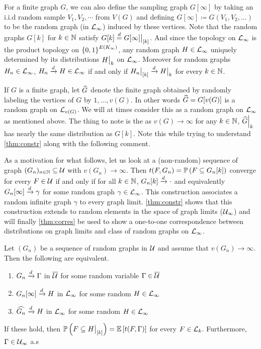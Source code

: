 \documentclass{article}
\begin{document}
For a finite graph $G$, we can also define the sampling graph $G[\infty]$ by taking an i.i.d random sample $V_1, V_2,\cdots$ from $V(G)$ and defining $G[\infty] \coloneqq G(V_1, V_2, \ldots)$ to be the random graph (in $\Lg_{\infty}$) induced by these vertices. Note that the random graphs $G[k]$ for $k \in \N$ satisfy $G[k] \dequal \restr{G[\infty]}{[k]}$. And since the topology on $\Lg_{\infty}$ is the product topology on $\left\{ 0,1 \right\}^{E(K_\infty)}$, any random graph $H \in \Lg_{\infty}$ uniquely determined by its distributions $\restr{H}{k}$ on $\Lg_{\infty}$. Moreover for random graphs $H_n \in \Lg_{\infty}$, $H_n \dconv H \in \Lg_{\infty}$ if and only if $\restr{H_n}{[k]} \dconv \restr{H}{k}$ for every $k \in \N$.

If $G$ is a finite graph, let $\widehat{G}$ denote the finite graph obtained by randomly labeling the vertices of $G$ by $1,\dots, v(G)$. In other words $\widehat{G} = G[v(G)]$ is a random graph on $\Lg_{v(G)}$.  We will at times consider this as a random graph on $\Lg_{\infty}$ as mentioned above. The thing to note is the as $v(G) \to \infty$ for any $k \in \N$, $\restr{\h{G}}{k}$ has nearly the same distribution as $G[k]$. Note this while trying to understand \autoref{thm:constr} along with the following comment.

As a motivation for what follows, let us look at a (non-random) sequence of graph $(G_n)_{n \in \N} \subseteq \Ug$ with $v(G_n) \to \infty$. Then $t(F, G_n) = \Pb(F \subseteq G_n[k])$ converge for every $F \in \Ug$ if and only if for all $k \in \N$, $G_n[k] \xrightarrow{d} \cdot $ and equivalently $G_n[\infty] \xrightarrow{d} \gamma$ for some random graph $\gamma \in \Lg_{\infty}$. This construction associates a random infinite graph $\gamma$ to every graph limit. \autoref{thm:constr} shows that this construction extends to random elements in the space of graph limits ($\Ug_{\infty}$) and will finally \autoref{thm:corres} be used to show a one-to-one correspondence between distributions on graph limits and class of random graphs on $\Lg_{\infty}$.

\begin{theorem}
  \label{thm:constr}
   Let $\left( G_n \right)$ be a sequence of random graphs in $\Ug$ and assume that $v(G_n) \to \infty$. Then the following are equivalent.
  \begin{enumerate}
    \item $G_n \xrightarrow{d} \Gamma$ in $\Ug*$ for some random variable $\Gamma \in \Ug*$
    \item $G_n[\infty] \xrightarrow{d} H$ in $\Lg_{\infty}$ for some random $H \in \Lg_{\infty}$
    \item $\widehat{G_n} \xrightarrow{d} H$ in $\Lg_{\infty}$ for some random $H \in \Lg_{\infty}$
  \end{enumerate}
  If these hold, then $\Pb(F \subseteq \restr{H}{[k]}) = \Ex[t(F, \Gamma)]$ for every $F \in \Lg_{k}$. Furthermore, $\Gamma \in \Ug_{\infty}$ a.s
  \label{thm:conv-to-infinite-graphs}
\end{theorem}
\end{document}
